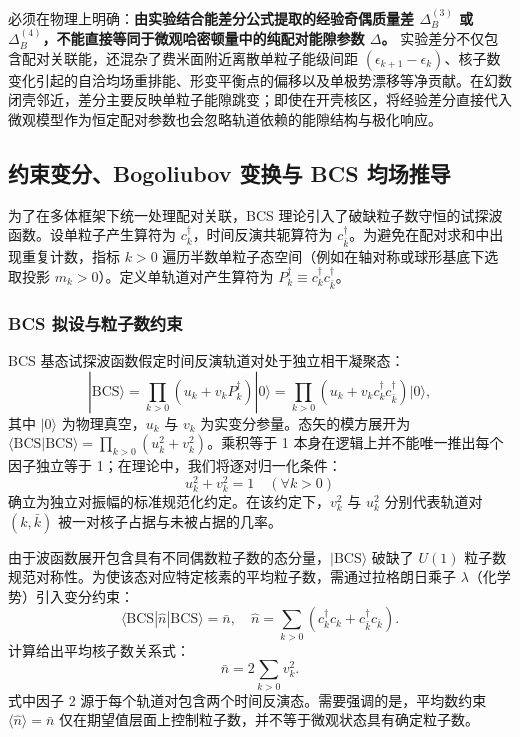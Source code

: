 必须在物理上明确：\textbf{由实验结合能差分公式提取的经验奇偶质量差 $\Delta_B^{(3)}$ 或 $\Delta_B^{(4)}$，不能直接等同于微观哈密顿量中的纯配对能隙参数 $\Delta$。} 实验差分不仅包含配对关联能，还混杂了费米面附近离散单粒子能级间距 $(\epsilon_{k+1} - \epsilon_k)$、核子数变化引起的自洽均场重排能、形变平衡点的偏移以及单极势漂移等净贡献。在幻数闭壳邻近，差分主要反映单粒子能隙跳变；即使在开壳核区，将经验差分直接代入微观模型作为恒定配对参数也会忽略轨道依赖的能隙结构与极化响应。



\subsection{约束变分、Bogoliubov 变换与 BCS 均场推导}\label{sec:2-3-2}


为了在多体框架下统一处理配对关联，BCS 理论引入了破缺粒子数守恒的试探波函数。设单粒子产生算符为 $c_k^\dagger$，时间反演共轭算符为 $c_{\bar{k}}^\dagger$。为避免在配对求和中出现重复计数，指标 $k > 0$ 遍历半数单粒子态空间（例如在轴对称或球形基底下选取投影 $m_k > 0$）。定义单轨道对产生算符为 $P_k^\dagger \equiv c_k^\dagger c_{\bar{k}}^\dagger$。


\subsubsection{BCS 拟设与粒子数约束}\label{sec:2-3-bcs拟设与粒子数约束}


BCS 基态试探波函数假定时间反演轨道对处于独立相干凝聚态\cite{book-suhonen-from-nucleons-to-nucleus}：
\begin{equation}\label{eq:2-3-6}
|\mathrm{BCS}\rangle = \prod_{k>0} \left( u_k + v_k P_k^\dagger \right) |0\rangle = \prod_{k>0} \left( u_k + v_k c_k^\dagger c_{\bar{k}}^\dagger \right) |0\rangle,
\end{equation}
其中 $|0\rangle$ 为物理真空，$u_k$ 与 $v_k$ 为实变分参量。态矢的模方展开为 $\langle\mathrm{BCS}|\mathrm{BCS}\rangle = \prod_{k>0} (u_k^2 + v_k^2)$。乘积等于 1 本身在逻辑上并不能唯一推出每个因子独立等于 1；在理论中，我们将逐对归一化条件：
\begin{equation}\label{eq:2-3-7}
u_k^2 + v_k^2 = 1 \quad (\forall k > 0)
\end{equation}
确立为独立对振幅的标准规范化约定。在该约定下，$v_k^2$ 与 $u_k^2$ 分别代表轨道对 $(k, \bar{k})$ 被一对核子占据与未被占据的几率。

由于波函数展开包含具有不同偶数粒子数的态分量，$|\mathrm{BCS}\rangle$ 破缺了 $U(1)$ 粒子数规范对称性。为使该态对应特定核素的平均粒子数，需通过拉格朗日乘子 $\lambda$（化学势）引入变分约束：
\begin{equation}\label{eq:2-3-8}
\langle\mathrm{BCS}| \hat{n} |\mathrm{BCS}\rangle = \bar{n}, \quad \hat{n} = \sum_{k>0} \left( c_k^\dagger c_k + c_{\bar{k}}^\dagger c_{\bar{k}} \right).
\end{equation}
计算给出平均核子数关系式：
\begin{equation}\label{eq:2-3-9}
\bar{n} = 2 \sum_{k>0} v_k^2.
\end{equation}
式中因子 $2$ 源于每个轨道对包含两个时间反演态。需要强调的是，平均数约束 $\langle\hat{n}\rangle = \bar{n}$ 仅在期望值层面上控制粒子数，并不等于微观状态具有确定粒子数。


